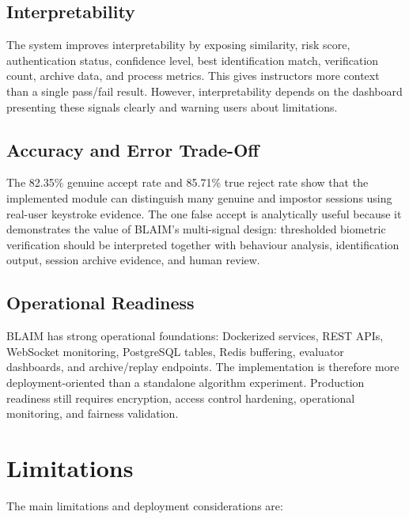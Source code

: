 \subsection{Interpretability}
\label{subsec:interpretability}

The system improves interpretability by exposing similarity, risk score, authentication status, confidence level, best identification match, verification count, archive data, and process metrics. This gives instructors more context than a single pass/fail result. However, interpretability depends on the dashboard presenting these signals clearly and warning users about limitations.

\subsection{Accuracy and Error Trade-Off}
\label{subsec:error-tradeoff}

The 82.35\% genuine accept rate and 85.71\% true reject rate show that the implemented module can distinguish many genuine and impostor sessions using real-user keystroke evidence. The one false accept is analytically useful because it demonstrates the value of BLAIM's multi-signal design: thresholded biometric verification should be interpreted together with behaviour analysis, identification output, session archive evidence, and human review.

\subsection{Operational Readiness}
\label{subsec:operational-readiness}

BLAIM has strong operational foundations: Dockerized services, REST APIs, WebSocket monitoring, PostgreSQL tables, Redis buffering, evaluator dashboards, and archive/replay endpoints. The implementation is therefore more deployment-oriented than a standalone algorithm experiment. Production readiness still requires encryption, access control hardening, operational monitoring, and fairness validation.

\section{Limitations}
\label{sec:limitations}

The main limitations and deployment considerations are:

